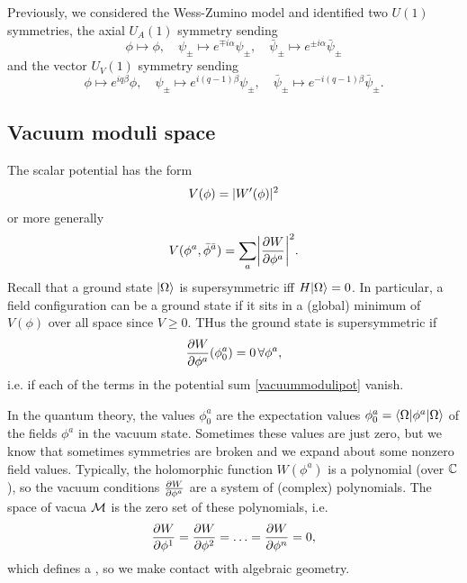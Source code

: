 Previously, we considered the Wess-Zumino model and identified two $U(1)$ symmetries, the axial $U_A(1)$ symmetry sending
\begin{equation}
    \phi \mapsto \phi,\quad \psi_\pm \mapsto e^{\mp i\alpha}\psi_\pm, \quad \bar \psi_\pm \mapsto e^{\pm i\alpha} \bar \psi_\pm
\end{equation}
and the vector $U_V(1)$ symmetry sending
\begin{equation}
    \phi \mapsto e^{iq\beta} \phi,\quad \psi_\pm \mapsto e^{i(q-1) \beta}\psi_\pm,\quad \bar \psi_\pm \mapsto e^{-i(q-1)\beta} \bar \psi_\pm.
\end{equation}

\subsection*{Vacuum moduli space}
The scalar potential has the form
\begin{equation*}
    V(\phi)=\abs{W'(\phi)}^2
\end{equation*}
or more generally
\begin{equation}\label{vacuummodulipot}
    V(\phi^a,\bar \phi^{\bar a})=\sum_a \abs*{\P{W}{\phi^a}}^2.
\end{equation}
Recall that a ground state $\ket{\Omega}$ is supersymmetric iff $H\ket{\Omega}=0$. In particular, a field configuration can be a ground state if it sits in a (global) minimum of $V(\phi)$ over all space since $V\geq 0$. THus the ground state is supersymmetric if
\begin{equation*}
    \P{W}{\phi^a}(\phi^a_0)=0\, \forall \phi^a,
\end{equation*}
i.e. if each of the terms in the potential sum \ref{vacuummodulipot} vanish.

In the quantum theory, the values $\phi^a_0$ are the expectation values $\phi_0^a = \bra{\Omega} \phi^a \ket{\Omega}$ of the fields $\phi^a$ in the vacuum state. Sometimes these values are just zero, but we know that sometimes symmetries are broken and we expand about some nonzero field values. Typically, the holomorphic function $W(\phi^a)$ is a polynomial (over $\CC$), so the vacuum conditions $\P{W}{\phi^a}$ are a system of (complex) polynomials. The space of vacua $\cM$ is the zero set of these polynomials, i.e.
\begin{equation}
    \P{W}{\phi^1}=\P{W}{\phi^2}=\ldots = \P{W}{\phi^n}=0,
\end{equation}
which defines a , so we make contact with algebraic geometry.


